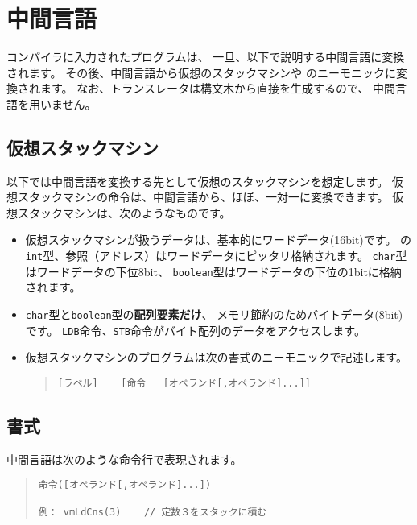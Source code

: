 % 
%
\chapter{中間言語}
\label{app:vm}

\cmm コンパイラに入力された\cmm プログラムは、
一旦、以下で説明する中間言語に変換されます。
その後、中間言語から仮想のスタックマシンや
\tac のニーモニックに変換されます。
なお、{\cl}トランスレータは構文木から直接{\cl}を生成するので、
中間言語を用いません。

\section{仮想スタックマシン}

以下では中間言語を変換する先として仮想のスタックマシンを想定します。
仮想スタックマシンの命令は、中間言語から、ほぼ、一対一に変換できます。
仮想スタックマシンは、次のようなものです。

\begin{itemize}
\item 
仮想スタックマシンが扱うデータは、基本的にワードデータ(16bit)です。
{\cmml}の\verb/int/型、参照（アドレス）はワードデータにピッタリ格納されます。
\verb/char/型はワードデータの下位8bit、
\verb/boolean/型はワードデータの下位の1bitに格納されます。

\item
\verb/char/型と\verb/boolean/型の{\bf 配列要素だけ}、
メモリ節約のためバイトデータ(8bit)です。
\verb/LDB/命令、\verb/STB/命令がバイト配列のデータをアクセスします。

\item
仮想スタックマシンのプログラムは次の書式のニーモニックで記述します。

\begin{quote}
\begin{verbatim}
[ラベル]    [命令   [オペランド[,オペランド]...]]
\end{verbatim}
\end{quote}

\end{itemize}

\section{書式}

中間言語は次のような命令行で表現されます。

\begin{quote}
\begin{verbatim}
命令([オペランド[,オペランド]...])

例： vmLdCns(3)    // 定数３をスタックに積む
\end{verbatim}
\end{quote}

